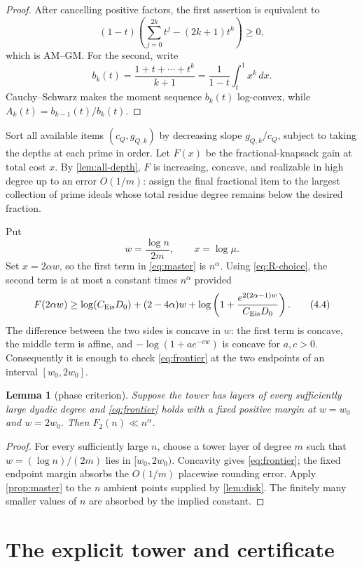 \documentclass[11pt]{article}
\newtheorem{lemma}[theorem]{Lemma}
\theoremstyle{definition}
\theoremstyle{remark}
\begin{document}
\begin{proof}
After cancelling positive factors, the first assertion is equivalent to
\[
 (1-t)\left(\sum_{j=0}^{2k}t^j-(2k+1)t^k\right)\ge0,
\]
which is AM--GM.  For the second, write
\[
 b_k(t)=\frac{1+t+\cdots+t^k}{k+1}
       =\frac1{1-t}\int_t^1x^k\,dx.
\]
Cauchy--Schwarz makes the moment sequence $b_k(t)$ log-convex, while
$A_k(t)=b_{k-1}(t)/b_k(t)$.
\end{proof}

Sort all available items $(c_Q,g_{Q,k})$ by decreasing slope
$g_{Q,k}/c_Q$, subject to taking the depths at each prime in order.  Let
$F(x)$ be the fractional-knapsack gain at total cost $x$.  By
\cref{lem:all-depth}, $F$ is increasing, concave, and realizable in high
degree up to an error $O(1/m)$: assign the final fractional item to the
largest collection of prime ideals whose total residue degree remains below
the desired fraction.

Put
\[
 w=\frac{\log n}{2m},\qquad x=\log\mu.
\]
Set $x=2\alpha w$, so the first term in \eqref{eq:master} is $n^\alpha$.
Using \eqref{eq:R-choice}, the second term is at most a constant times
$n^\alpha$
provided
\[
 F(2\alpha w)\ge
 \log(C_{\rm Eis}D_0)+(2-4\alpha)w+
 \log\left(1+
 \frac{e^{2(2\alpha-1)w}}{C_{\rm Eis}D_0}\right).       \tag{4.4}\label{eq:frontier}
\]
The difference between the two sides is concave in $w$: the first term is
concave, the middle term is affine, and
$-\log(1+ae^{-cw})$ is concave for $a,c>0$.  Consequently it is enough to
check \eqref{eq:frontier} at the two endpoints of an interval
$[w_0,2w_0]$.

\begin{lemma}[phase criterion]\label{lem:phase}
Suppose the tower has layers of every sufficiently large dyadic degree and
\eqref{eq:frontier} holds with a fixed positive margin at $w=w_0$ and
$w=2w_0$.
Then $F_2(n)\ll n^\alpha$.
\end{lemma}

\begin{proof}
For every sufficiently large $n$, choose a tower layer of degree $m$ such
that $w=(\log n)/(2m)$ lies in $[w_0,2w_0)$.  Concavity gives
\eqref{eq:frontier}; the fixed endpoint margin absorbs the $O(1/m)$ placewise
rounding error.  Apply \cref{prop:master} to the $n$ ambient points supplied
by \cref{lem:disk}.  The finitely many smaller values of $n$ are absorbed
by the implied constant.
\end{proof}

\section{The explicit tower and certificate}
\end{document}
